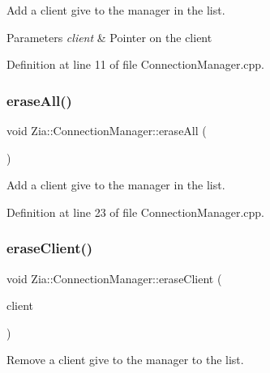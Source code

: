 Add a client give to the manager in the list. 


\begin{DoxyParams}{Parameters}
{\em client} & Pointer on the client \\
\hline
\end{DoxyParams}


Definition at line 11 of file Connection\+Manager.\+cpp.

\mbox{\label{class_zia_1_1_connection_manager_ac1db00d9a69520616bc20e0ac1ea311f}} 
\subsubsection{\texorpdfstring{erase\+All()}{eraseAll()}}
{\footnotesize\ttfamily void Zia\+::\+Connection\+Manager\+::erase\+All (\begin{DoxyParamCaption}\item[{void}]{ }\end{DoxyParamCaption})}



Add a client give to the manager in the list. 



Definition at line 23 of file Connection\+Manager.\+cpp.

\mbox{\label{class_zia_1_1_connection_manager_a61efd54810ec831b994c7ef148bec2ae}} 
\subsubsection{\texorpdfstring{erase\+Client()}{eraseClient()}}
{\footnotesize\ttfamily void Zia\+::\+Connection\+Manager\+::erase\+Client (\begin{DoxyParamCaption}\item[{\hyperlink{_connection_manager_8hpp_a0e374529952c927bd9f59c9acbccf624}{Connection\+Ptr}}]{client }\end{DoxyParamCaption})}



Remove a client give to the manager to the list. 


